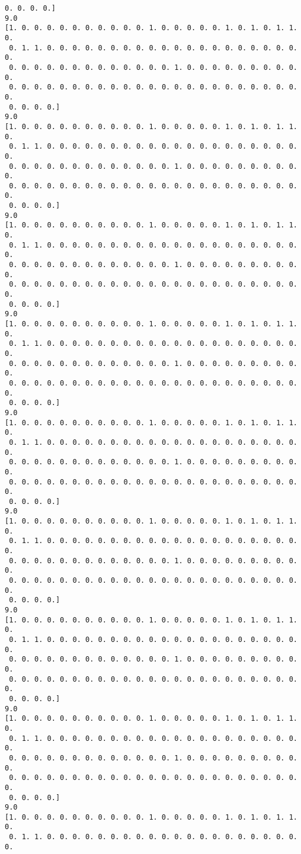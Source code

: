 \documentclass[11pt]{article}
\begin{document}
\begin{Verbatim}[commandchars=\\\{\}]
 0. 0. 0. 0.]
9.0
[1. 0. 0. 0. 0. 0. 0. 0. 0. 0. 0. 1. 0. 0. 0. 0. 0. 1. 0. 1. 0. 1. 1. 0.
 0. 1. 1. 0. 0. 0. 0. 0. 0. 0. 0. 0. 0. 0. 0. 0. 0. 0. 0. 0. 0. 0. 0. 0.
 0. 0. 0. 0. 0. 0. 0. 0. 0. 0. 0. 0. 0. 1. 0. 0. 0. 0. 0. 0. 0. 0. 0. 0.
 0. 0. 0. 0. 0. 0. 0. 0. 0. 0. 0. 0. 0. 0. 0. 0. 0. 0. 0. 0. 0. 0. 0. 0.
 0. 0. 0. 0.]
9.0
[1. 0. 0. 0. 0. 0. 0. 0. 0. 0. 0. 1. 0. 0. 0. 0. 0. 1. 0. 1. 0. 1. 1. 0.
 0. 1. 1. 0. 0. 0. 0. 0. 0. 0. 0. 0. 0. 0. 0. 0. 0. 0. 0. 0. 0. 0. 0. 0.
 0. 0. 0. 0. 0. 0. 0. 0. 0. 0. 0. 0. 0. 1. 0. 0. 0. 0. 0. 0. 0. 0. 0. 0.
 0. 0. 0. 0. 0. 0. 0. 0. 0. 0. 0. 0. 0. 0. 0. 0. 0. 0. 0. 0. 0. 0. 0. 0.
 0. 0. 0. 0.]
9.0
[1. 0. 0. 0. 0. 0. 0. 0. 0. 0. 0. 1. 0. 0. 0. 0. 0. 1. 0. 1. 0. 1. 1. 0.
 0. 1. 1. 0. 0. 0. 0. 0. 0. 0. 0. 0. 0. 0. 0. 0. 0. 0. 0. 0. 0. 0. 0. 0.
 0. 0. 0. 0. 0. 0. 0. 0. 0. 0. 0. 0. 0. 1. 0. 0. 0. 0. 0. 0. 0. 0. 0. 0.
 0. 0. 0. 0. 0. 0. 0. 0. 0. 0. 0. 0. 0. 0. 0. 0. 0. 0. 0. 0. 0. 0. 0. 0.
 0. 0. 0. 0.]
9.0
[1. 0. 0. 0. 0. 0. 0. 0. 0. 0. 0. 1. 0. 0. 0. 0. 0. 1. 0. 1. 0. 1. 1. 0.
 0. 1. 1. 0. 0. 0. 0. 0. 0. 0. 0. 0. 0. 0. 0. 0. 0. 0. 0. 0. 0. 0. 0. 0.
 0. 0. 0. 0. 0. 0. 0. 0. 0. 0. 0. 0. 0. 1. 0. 0. 0. 0. 0. 0. 0. 0. 0. 0.
 0. 0. 0. 0. 0. 0. 0. 0. 0. 0. 0. 0. 0. 0. 0. 0. 0. 0. 0. 0. 0. 0. 0. 0.
 0. 0. 0. 0.]
9.0
[1. 0. 0. 0. 0. 0. 0. 0. 0. 0. 0. 1. 0. 0. 0. 0. 0. 1. 0. 1. 0. 1. 1. 0.
 0. 1. 1. 0. 0. 0. 0. 0. 0. 0. 0. 0. 0. 0. 0. 0. 0. 0. 0. 0. 0. 0. 0. 0.
 0. 0. 0. 0. 0. 0. 0. 0. 0. 0. 0. 0. 0. 1. 0. 0. 0. 0. 0. 0. 0. 0. 0. 0.
 0. 0. 0. 0. 0. 0. 0. 0. 0. 0. 0. 0. 0. 0. 0. 0. 0. 0. 0. 0. 0. 0. 0. 0.
 0. 0. 0. 0.]
9.0
[1. 0. 0. 0. 0. 0. 0. 0. 0. 0. 0. 1. 0. 0. 0. 0. 0. 1. 0. 1. 0. 1. 1. 0.
 0. 1. 1. 0. 0. 0. 0. 0. 0. 0. 0. 0. 0. 0. 0. 0. 0. 0. 0. 0. 0. 0. 0. 0.
 0. 0. 0. 0. 0. 0. 0. 0. 0. 0. 0. 0. 0. 1. 0. 0. 0. 0. 0. 0. 0. 0. 0. 0.
 0. 0. 0. 0. 0. 0. 0. 0. 0. 0. 0. 0. 0. 0. 0. 0. 0. 0. 0. 0. 0. 0. 0. 0.
 0. 0. 0. 0.]
9.0
[1. 0. 0. 0. 0. 0. 0. 0. 0. 0. 0. 1. 0. 0. 0. 0. 0. 1. 0. 1. 0. 1. 1. 0.
 0. 1. 1. 0. 0. 0. 0. 0. 0. 0. 0. 0. 0. 0. 0. 0. 0. 0. 0. 0. 0. 0. 0. 0.
 0. 0. 0. 0. 0. 0. 0. 0. 0. 0. 0. 0. 0. 1. 0. 0. 0. 0. 0. 0. 0. 0. 0. 0.
 0. 0. 0. 0. 0. 0. 0. 0. 0. 0. 0. 0. 0. 0. 0. 0. 0. 0. 0. 0. 0. 0. 0. 0.
 0. 0. 0. 0.]
9.0
[1. 0. 0. 0. 0. 0. 0. 0. 0. 0. 0. 1. 0. 0. 0. 0. 0. 1. 0. 1. 0. 1. 1. 0.
 0. 1. 1. 0. 0. 0. 0. 0. 0. 0. 0. 0. 0. 0. 0. 0. 0. 0. 0. 0. 0. 0. 0. 0.
 0. 0. 0. 0. 0. 0. 0. 0. 0. 0. 0. 0. 0. 1. 0. 0. 0. 0. 0. 0. 0. 0. 0. 0.
 0. 0. 0. 0. 0. 0. 0. 0. 0. 0. 0. 0. 0. 0. 0. 0. 0. 0. 0. 0. 0. 0. 0. 0.
 0. 0. 0. 0.]
9.0
[1. 0. 0. 0. 0. 0. 0. 0. 0. 0. 0. 1. 0. 0. 0. 0. 0. 1. 0. 1. 0. 1. 1. 0.
 0. 1. 1. 0. 0. 0. 0. 0. 0. 0. 0. 0. 0. 0. 0. 0. 0. 0. 0. 0. 0. 0. 0. 0.

\end{Verbatim}
\end{document}
